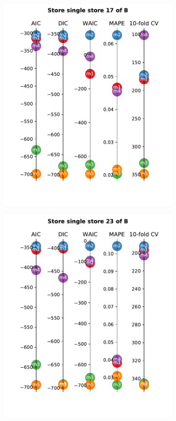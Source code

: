 \documentclass[english, 12pt, a4paper, sci, utf8, a-1b, online]{aaltothesis}
\begin{document}
\begin{figure}[hbt]
\begin{subfigure}[htb]{0.33\textwidth}
		\includegraphics[width=\textwidth]{../plots/metrics/metrics_plot_single_store_17_of_B.pdf}
	\end{subfigure}
	\hfill
	\begin{subfigure}[htb]{0.33\textwidth}
		\centering
		\includegraphics[width=\textwidth]{../plots/metrics/metrics_plot_single_store_23_of_B.pdf}

\end{subfigure}
\end{figure}
\end{document}
